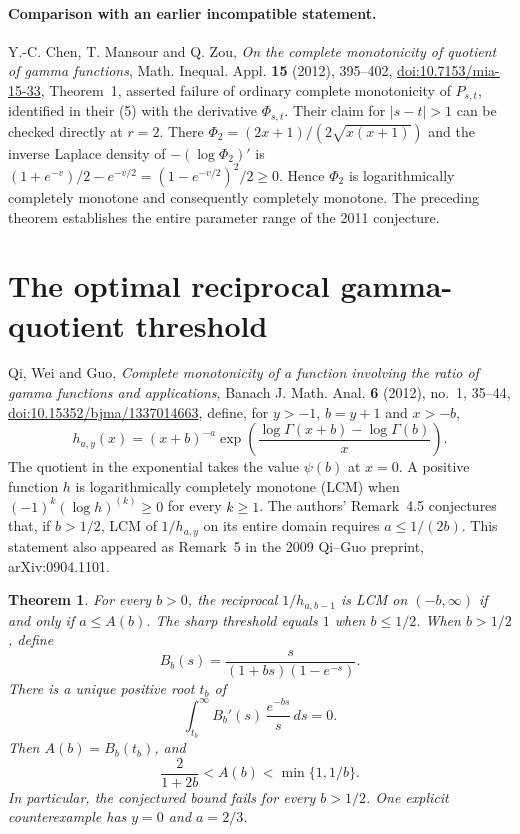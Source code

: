 \documentclass[11pt,a4paper]{article}
\newtheorem{theorem}{Theorem}[section]
\numberwithin{equation}{section}
\begin{document}
\paragraph{Comparison with an earlier incompatible statement.}
Y.-C. Chen, T. Mansour and Q. Zou, \emph{On the complete monotonicity
of quotient of gamma functions}, Math. Inequal. Appl. \textbf{15}
(2012), 395--402, \href{https://doi.org/10.7153/mia-15-33}{doi:10.7153/mia-15-33},
Theorem~1, asserted failure of ordinary complete monotonicity of
$P_{s,t}$, identified in their (5) with the derivative $\Phi_{s,t}$.
Their claim for $|s-t|>1$ can be checked directly at $r=2$.
There $\Phi_2=(2x+1)/(2\sqrt{x(x+1)})$ and the inverse Laplace
density of $-(\log\Phi_2)'$ is
$(1+e^{-v})/2-e^{-v/2}=(1-e^{-v/2})^2/2\ge0$.
Hence $\Phi_2$ is logarithmically completely monotone and consequently
completely monotone. The preceding theorem establishes the entire
parameter range of the 2011 conjecture.


\section{The optimal reciprocal gamma-quotient threshold}
\label{sec:qwg}
Qi, Wei and Guo, \emph{Complete monotonicity of a function involving
the ratio of gamma functions and applications}, Banach J. Math. Anal.
\textbf{6} (2012), no.~1, 35--44,
\href{https://doi.org/10.15352/bjma/1337014663}{doi:10.15352/bjma/1337014663},
define, for $y>-1$, $b=y+1$ and $x>-b$,
\[
 h_{a,y}(x)=(x+b)^{-a}
       \exp\left(\frac{\log\Gamma(x+b)-\log\Gamma(b)}{x}\right).
\]
The quotient in the exponential takes the value $\psi(b)$ at $x=0$.
A positive function $h$ is logarithmically completely monotone (LCM)
when $(-1)^k(\log h)^{(k)}\ge0$ for every $k\ge1$.
The authors' Remark~4.5 conjectures that, if $b>1/2$, LCM of $1/h_{a,y}$
on its entire domain requires $a\le1/(2b)$. This statement also appeared
as Remark~5 in the 2009 Qi--Guo preprint, arXiv:0904.1101.

\begin{theorem}\label{qwg:main}
For every $b>0$, the reciprocal $1/h_{a,b-1}$ is LCM on $(-b,\infty)$
if and only if $a\le A(b)$. The sharp threshold equals $1$ when $b\le1/2$.
When $b>1/2$, define
\[
 B_b(s)=\frac{s}{(1+bs)(1-e^{-s})}.
\]
There is a unique positive root $t_b$ of
\[
       \int_{t_b}^{\infty} B_b'(s)\,\frac{e^{-bs}}s\,ds=0 .
\]
Then $A(b)=B_b(t_b)$, and
\[
       \frac{2}{1+2b}< A(b)<\min\{1,1/b\}.
\]
In particular, the conjectured bound fails for every $b>1/2$.
One explicit counterexample has $y=0$ and $a=2/3$.
\end{theorem}
\end{document}
